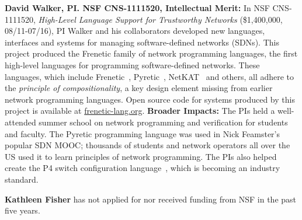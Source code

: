 \noindent
{\bf David Walker, PI. NSF CNS-1111520, Intellectual Merit:}
In NSF CNS-1111520, \emph{High-Level Language Support for Trustworthy Networks}
(\$1,400,000, 08/11-07/16),
PI Walker and his collaborators developed new languages, interfaces
and systems for managing software-defined networks (SDNs).  
This project produced the Frenetic family
of network programming languages, the first high-level languages for
programming software-defined networks.  These languages, which include
Frenetic~\cite{frenetic}, 
Pyretic~\cite{pyretic},
NetKAT~\cite{netkat} and others, all adhere to the
\emph{principle of compositionality}, a key design element missing
from earlier network programming languages.  
Open source code for systems produced by this project is available
at \url{frenetic-lang.org}.
%
{\bf Broader Impacts:} 
The PIs held a well-attended summer school on network programming and 
verification for students and faculty. The
Pyretic programming language was used in Nick Feamster's popular
SDN MOOC; thousands of students and
network operators all over the US used it to learn principles of network
programming.  The PIs
also helped create the P4 switch configuration language~\cite{P4}, which is
becoming an industry standard.

\medskip
\noindent
{\bf Kathleen Fisher} has not applied for nor received funding from NSF in the past
five years.



